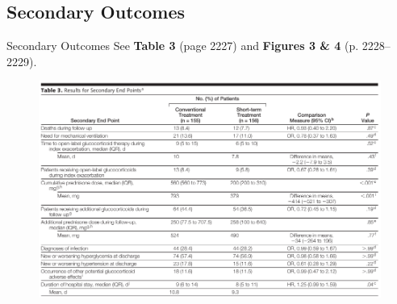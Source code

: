 \documentclass{beamer}
\begin{document}
	\subsection{Secondary Outcomes}
		\begin{frame}{Secondary Outcomes}
			See \textbf{Table 3} (page 2227) and \textbf{Figures 3 \& 4} (p. 2228--2229).
			\pause
			\begin{figure}
				\centering
				\includegraphics[width=0.90\linewidth]{../reports/figures/table3}
				\label{fig:table3}
			\end{figure}
		\end{frame}
\end{document}
